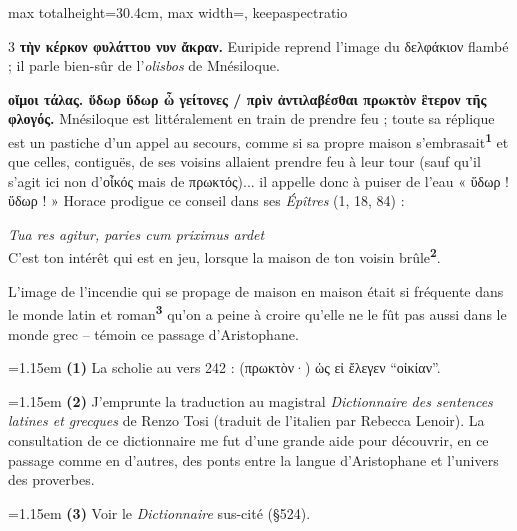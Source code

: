 \documentclass[11pt,twoside]{book}
\newcommand{\italique}[1]{\textit{#1}}
\newcommand{\citComm}[1]{\begin{quoting}[vskip=0.4pt,leftmargin=0.7em,rightmargin=0.2em]#1\end{quoting}}
\newcommand{\francais}[1]{{\policeFr #1}}
\newcommand{\latin}[1]{\textit{#1}}
\newcommand{\marqueur}[1]{\textsuperscript{\color{rubricRed}\textbf{#1}}}
\begin{document}
\begin{adjustbox}{max totalheight=30.4cm, max width=\textwidth, keepaspectratio}
\begin{minipage}{\textwidth}
{\begin{multicols}{3}
 \textbf{τὴν κέρκον φυλάττου νυν ἄκραν.} Euripide reprend l'image du δελφάκιον flambé ; il parle bien-sûr de l'\italique{olisbos} de Mnésiloque.
\par\vspace{1.5pt}
 \textbf{οἴμοι τάλας. ὕδωρ ὕδωρ ὦ γείτονες / πρὶν ἀντιλαβέσθαι πρωκτὸν ἓτερον τῆς φλογός.} Mnésiloque est littéralement en train de prendre feu ; toute sa réplique est un pastiche d'un appel au secours, comme si sa propre maison s'embrasait\marqueur{1} et que celles, contiguës, de ses voisins allaient prendre feu à leur tour (sauf qu'il s'agit ici non d'οἶκός mais de πρωκτός)... il appelle donc à puiser de l'eau « ὕδωρ ! ὕδωρ ! »  Horace prodigue ce conseil dans ses \italique{Épîtres} (1, 18, 84) :
\citComm{\latin{Tua res agitur, paries cum priximus ardet}\\
\francais{C'est ton intérêt qui est en jeu, lorsque la maison de ton voisin brûle\marqueur{2}.}}
\par\vspace{1.5pt}
\noindent L'image de l'incendie qui se propage de maison en maison était si fréquente dans le monde latin et roman\marqueur{3} qu'on a peine à croire qu'elle ne le fût pas aussi dans le monde grec -- témoin ce passage d'Aristophane.
\par\vspace{1.5pt}
\par\vspace{1.2pt}\par\nopagebreak\vspace{1pt}\noindent\hangindent=1.15em {\color{sepiaNote}\textbf{(1)}} La scholie au vers 242 : (πρωκτὸν·) ὡς εἰ ἔλεγεν ``οἰκίαν''.
\par\vspace{1.5pt}
\noindent\hangindent=1.15em {\color{sepiaNote}\textbf{(2)}} J'emprunte la traduction au magistral \italique{Dictionnaire des sentences latines et grecques} de Renzo Tosi (traduit de l'italien par Rebecca Lenoir). La consultation de ce dictionnaire me fut d'une grande aide pour découvrir, en ce passage comme en d'autres, des ponts entre la langue d'Aristophane et l'univers des proverbes.
\par\vspace{1.5pt}
\noindent\hangindent=1.15em {\color{sepiaNote}\textbf{(3)}} Voir le \italique{Dictionnaire} sus-cité (§524).

\end{multicols}}
\end{minipage}
\end{adjustbox}
\end{document}
